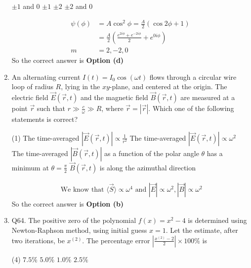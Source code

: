 \begin{enumerate}
\begin{tasks}
	\task[\textbf{a.}]$\pm 1$ and 0
	\task[\textbf{b.}]$\pm 1$
	\task[\textbf{c.}]$\pm 2$
	\task[\textbf{d.}]  $\pm 2$ and 0
\end{tasks}
\begin{answer}
	\begin{align*}
	\psi(\phi)&=A \cos ^{2} \phi=\frac{A}{2}(\cos 2 \phi+1)\\
	&=\frac{A}{2}\left(\frac{e^{2 i \phi}+e^{-2 i \phi}}{2}+e^{0 i \phi}\right) \\
	m&=2,-2,0
	\end{align*}
		So the correct answer is \textbf{Option (d)}
\end{answer}
\item An alternating current $I(t)=I_{0} \cos (\omega t)$ flows through a circular wire loop of radius $R$, lying in the $x y$-plane, and centered at the origin. The electric field $\vec{E}(\vec{r}, t)$ and the magnetic field $\vec{B}(\vec{r}, t)$ are measured at a point $\vec{r}$ such that $r \gg \frac{c}{\omega} \gg R$, where $\vec{r}=|\vec{r}|$.
Which one of the following statements is correct?
 \begin{tasks}(1)
	\task[\textbf{a.}] The time-averaged $|\vec{E}(\vec{r}, t)| \propto \frac{1}{r^{2}}$
	\task[\textbf{b.}] The time-averaged $|\vec{E}(\vec{r}, t)| \propto \omega^{2}$
	\task[\textbf{c.}] The time-averaged $|\vec{B}(\vec{r}, t)|$ as a function of the polar angle $\theta$ has a minimum at $\theta=\frac{\pi}{2}$
	\task[\textbf{d.}]$\vec{B}(\vec{r}, t)$ is along the azimuthal direction 
\end{tasks}
\begin{answer}
	\begin{align*}
	\text { We know that }\langle\vec{S}\rangle \propto \omega^{4} \text { and }|\vec{E}| \propto \omega^{2},|\vec{B}| \propto \omega^{2}
	\end{align*}
	So the correct answer is \textbf{Option (b)}
\end{answer}
\item Q64. The positive zero of the polynomial $f(x)=x^{2}-4$ is determined using Newton-Raphson method, using initial guess $x=1$. Let the estimate, after two iterations, be $x^{(2)}$. The percentage error $\left|\frac{x^{(2)}-2}{2}\right| \times 100 \%$ is
 \begin{tasks}(4)
	\task[\textbf{a.}] $7.5 \%$
	\task[\textbf{b.}]$5.0 \%$
	\task[\textbf{c.}] $1.0 \%$
	\task[\textbf{d.}]  $2.5 \%$
\end{tasks}
\begin{answer}
	\begin{align*}

\end{align*}
\end{answer}
\end{enumerate}
